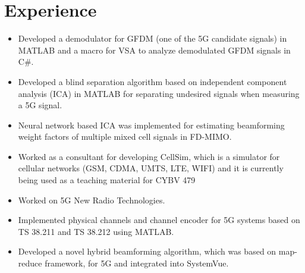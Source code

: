 \documentclass[10pt,letterpaper,roman]{moderncv}
\begin{document}
 
\makecvtitle 
\vspace*{-10mm} 


\section{Experience} 
\vspace*{1mm} 

 { 
\begin{itemize}%
	\item Developed a demodulator for GFDM (one of the 5G candidate signals) in MATLAB and a macro for VSA to analyze demodulated GFDM signals in C\#.
	\item Developed a blind separation algorithm based on independent component analysis (ICA) in MATLAB for separating undesired signals when measuring a 5G signal. 
	\item Neural network based ICA was implemented for estimating beamforming weight factors of multiple mixed cell signals in FD-MIMO.
\end{itemize}}
\vspace*{1mm} 

 { 
\begin{itemize}%
	\item Worked as a consultant for developing CellSim, which is a simulator for cellular networks (GSM, CDMA, UMTS, LTE, WIFI) and it is currently being used as a teaching material for CYBV 479
\end{itemize}} 
\vspace*{1mm} 

 { 
\begin{itemize}%
	\item Worked on 5G New Radio Technologies. 
	\item Implemented physical channels and channel encoder for 5G systems based on TS 38.211 and TS 38.212 using MATLAB.
	\item Developed a novel hybrid beamforming algorithm, which was based on map-reduce framework, for 5G and integrated into SystemVue.
\end{itemize}} 
\vspace*{1mm} 
\end{document}
